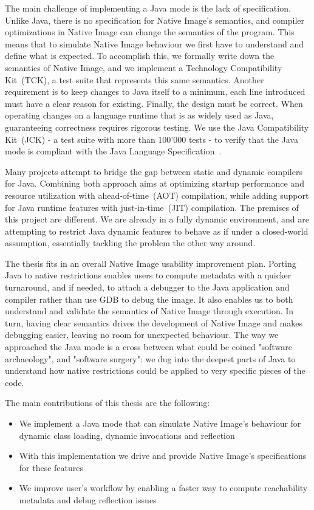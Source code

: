 The main challenge of implementing a Java mode is the lack of specification. Unlike Java, there is no specification for Native Image's semantics, and compiler optimizations in Native Image can change the semantics of the program. This means that to simulate Native Image behaviour we first have to understand and define what is expected. To accomplish this, we formally write down the semantics of Native Image, and we implement a Technology Compatibility Kit~(TCK), a test suite that represents this same semantics.
Another requirement is to keep changes to Java itself to a minimum, each line introduced must have a clear reason for existing.
Finally, the design must be correct. When operating changes on a language runtime that is as widely used as Java, guaranteeing correctness requires rigorous testing. We use the Java Compatibility Kit~(JCK) - a test suite with more than 100'000 tests - to verify that the Java mode is compliant with the Java Language Specification~\cite{noauthor_java_nodate-2}.

Many projects attempt to bridge the gap between static and dynamic compilers for Java. Combining both approach aims at optimizing startup performance and resource utilization with ahead-of-time~(AOT) compilation, while adding support for Java runtime features with just-in-time~(JIT) compilation. The premises of this project are different. We are already in a fully dynamic environment, and are attempting to restrict Java dynamic features to behave as if under a closed-world assumption, essentially tackling the problem the other way around.

The thesis fits in an overall Native Image usability improvement plan. Porting Java to native restrictions enables users to compute metadata with a quicker turnaround, and if needed, to attach a debugger to the Java application and compiler rather than use GDB to debug the image. It also enables us to both understand and validate the semantics of Native Image through execution. In turn, having clear semantics drives the development of Native Image and makes debugging easier, leaving no room for unexpected behaviour.
The way we approached the Java mode is a cross between what could be coined "software archaeology", and 
"software surgery": we dug into the deepest parts of Java to understand how native restrictions could be applied to very specific pieces of the code.

The main contributions of this thesis are the following:
\begin{itemize}
  \item We implement a Java mode that can simulate Native Image's behaviour for dynamic class loading, dynamic invocations and reflection
  \item With this implementation we drive and provide Native Image's specifications for these features
  \item We improve user's workflow by enabling a faster way to compute reachability metadata and debug reflection issues
\end{itemize}


